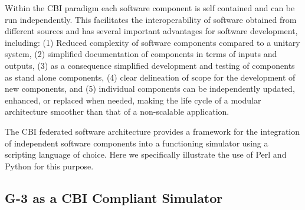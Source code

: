 \documentclass[12pt]{article}
\begin{document}
Within the CBI paradigm each software component is self contained and
can be run independently. This facilitates the interoperability of
software obtained from different sources and has several important
advantages for software development, including: (1) Reduced complexity
of software components compared to a unitary system, (2) simplified
documentation of components in terms of inputs and outputs, (3) as a
consequence simplified development and testing of components as stand
alone components, (4) clear delineation of scope for the development
of new components, and (5)
individual components can be independently updated, enhanced, or
replaced when needed, making the life cycle of a modular architecture
smoother than that of a non-scalable application.

The CBI federated software architecture provides a framework for the
integration of independent software components into a functioning
simulator using a scripting language of choice.  Here we specifically
illustrate the use of Perl and Python for this purpose.

\subsection{G-3 as a CBI Compliant Simulator}
\end{document}
